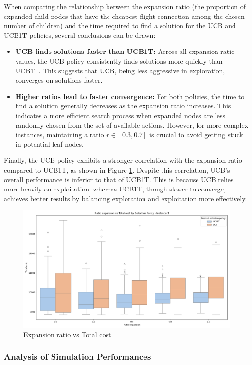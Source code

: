 When comparing the relationship between the expansion ratio (the proportion of expanded child nodes that have the cheapest flight connection among the chosen number of children) and the time required to find a solution for the UCB and UCB1T policies, several conclusions can be drawn:

\begin{itemize}
    \item \textbf{UCB finds solutions faster than UCB1T:}
          Across all expansion ratio values, the UCB policy consistently finds solutions more quickly than UCB1T. This suggests that UCB, being less aggressive in exploration, converges on solutions faster.

    \item \textbf{Higher ratios lead to faster convergence:}
          For both policies, the time to find a solution generally decreases as the expansion ratio increases. This indicates a more efficient search process when expanded nodes are less randomly chosen from the set of available actions. However, for more complex instances, maintaining a ratio \( r \in [0.3, 0.7] \) is crucial to avoid getting stuck in potential leaf nodes.
\end{itemize}

Finally, the UCB policy exhibits a stronger correlation with the expansion ratio compared to UCB1T, as shown in Figure \ref{fig:ratio_vs_cost_3}. Despite this correlation, UCB's overall performance is inferior to that of UCB1T. This is because UCB relies more heavily on exploitation, whereas UCB1T, though slower to converge, achieves better results by balancing exploration and exploitation more effectively.

\begin{figure}[!ht]
    \centering
    \includegraphics[width=.4\textwidth]{Figures/3 - ratio_vs_cost.png}
    \caption{Expansion ratio vs Total cost}
    \label{fig:ratio_vs_cost_3}
\end{figure}

\subsubsection*{Analysis of Simulation Performances}

